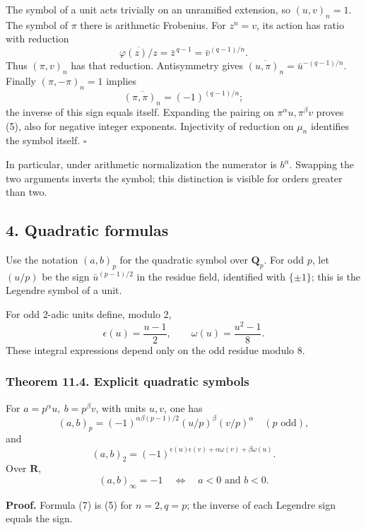 \documentclass[11pt,a4paper]{article}
\begin{document}
The symbol of a unit acts trivially on an unramified extension, so
\((u,v)_n=1\). The symbol of \(\pi\) there is arithmetic Frobenius. For
\(z^n=v\), its action has ratio with reduction \[
\overline{\varphi(z)/z}=\bar z^{\,q-1}
          =\bar v^{(q-1)/n}.
\] Thus \((\pi,v)_n\) has that reduction. Antisymmetry gives
\(\overline{(u,\pi)_n}=\bar u^{-(q-1)/n}\). Finally \((\pi,-\pi)_n=1\)
implies \[
\overline{(\pi,\pi)_n}=(-1)^{(q-1)/n};
\] the inverse of this sign equals itself. Expanding the pairing on
\(\pi^\alpha u,\pi^\beta v\) proves (5), also for negative integer
exponents. Injectivity of reduction on \(\mu_n\) identifies the symbol
itself. \(\square\)

In particular, under arithmetic normalization the numerator is
\(b^\alpha\). Swapping the two arguments inverts the symbol; this
distinction is visible for orders greater than two.

\subsection{4. Quadratic formulas}\label{quadratic-formulas}

Use the notation \((a,b)_p\) for the quadratic symbol over
\(\mathbf Q_p\). For odd \(p\), let \((u/p)\) be the sign
\(\bar u^{(p-1)/2}\) in the residue field, identified with \(\{\pm1\}\);
this is the Legendre symbol of a unit.

For odd \(2\)-adic units define, modulo 2, \[
\epsilon(u)=\frac{u-1}{2},\qquad
\omega(u)=\frac{u^2-1}{8}.
\tag{6}
\] These integral expressions depend only on the odd residue modulo 8.

\subsubsection{Theorem 11.4. Explicit quadratic
symbols}\label{theorem-11.4.-explicit-quadratic-symbols}

For \(a=p^\alpha u,\ b=p^\beta v\), with units \(u,v\), one has \[
(a,b)_p=(-1)^{\alpha\beta(p-1)/2}
           (u/p)^\beta(v/p)^\alpha\quad(p\text{ odd}),
\tag{7}
\] and \[
(a,b)_2=(-1)^{\epsilon(u)\epsilon(v)
                       +\alpha\omega(v)+\beta\omega(u)}.
\tag{8}
\] Over \(\mathbf R\), \[
(a,b)_\infty=-1
\quad\Longleftrightarrow\quad a<0\text{ and }b<0.
\tag{9}
\]

\textbf{Proof.} Formula (7) is (5) for \(n=2,q=p\); the inverse of each
Legendre sign equals the sign.
\end{document}
